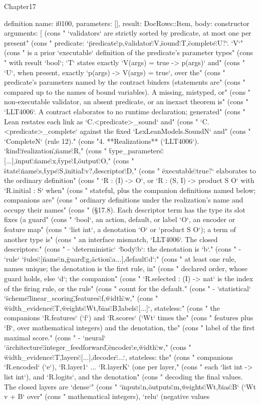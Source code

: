 \begin{lexlean}{Chapter17}
\begin{semanticmodule}
definition{
  name: i0100,
  parameters: [],
  result: DocRows::Item,
  body: constructor{
    arguments: [
      (cons "   `validators` are strictly sorted by predicate, at most one per present" (cons "   predicate: `{\"predicate\":p,\"validator\":V,\"sound\":T,\"complete\":U?}`. `V`" (cons "   is a prior `executable` definition of the predicate's parameter types" (cons "   with result `bool`; `T` states exactly `V(args) = true -> p(args)` and" (cons "   `U`, when present, exactly `p(args) -> V(args) = true`, over the" (cons "   predicate's parameters named by the contract binders (statements are" (cons "   compared up to the names of bound variables). A missing, mistyped, or" (cons "   non-executable validator, an absent predicate, or an inexact theorem is" (cons "   `LLT4006`. A contract elaborates to no runtime declaration; generated" (cons "   Lean restates each link as `C.<predicate>_sound` and" (cons "   `C.<predicate>_complete` against the fixed `LexLeanModels.SoundN` and" (cons "   `CompleteN` (rule 12)." (cons "4. **Realizations** (`LLT4006`). `{\"kind\":\"realization\",\"name\":R," (cons "   \"type_parameters\":[...],\"input\":{\"name\":x,\"type\":I},\"output\":O," (cons "   \"state\":{\"name\":s,\"type\":S,\"initial\":v}?,\"descriptor\":D," (cons "   \"executable\":true?}` elaborates to the ordinary definition" (cons "   `R : (I) -> O`, or `R : (S, I) -> product S O` with `R.initial : S` when" (cons "   stateful, plus the companion definitions named below; companions are" (cons "   ordinary definitions under the realization's name and occupy their names" (cons "   (§17.8). Each descriptor term has the type its slot fixes (a guard" (cons "   `bool`, an action, default, or label `O`, an encoder or feature map" (cons "   `list int`, a denotation `O` or `product S O`); a term of another type is" (cons "   an interface mismatch, `LLT4006`. The closed descriptors:" (cons "   - `deterministic` `{\"body\":b}`: the denotation is `b`." (cons "   - `rule` `{\"rules\":[{\"name\":n,\"guard\":g,\"action\":a}...],\"default\":d}`:" (cons "     at least one rule, names unique; the denotation is the first rule, in" (cons "     declared order, whose guard holds, else `d`; the companion" (cons "     `R.selected : (I) -> nat` is the index of the firing rule, or the rule" (cons "     count for the default." (cons "   - `statistical` `{\"scheme\":\"linear_scoring\",\"features\":f,\"width\":w," (cons "     \"width_evidence\":T,\"weights\":Wt,\"bias\":B,\"labels\":[...]}`, stateless:" (cons "     the companions `R.features` (`f`) and `R.scores` (`Wt` times the" (cons "     features plus `B`, over mathematical integers) and the denotation, the" (cons "     label of the first maximal score." (cons "   - `neural` `{\"architecture\":\"integer_feedforward\",\"encoder\":e,\"width\":w," (cons "     \"width_evidence\":T,\"layers\":[...],\"decoder\":...}`, stateless: the" (cons "     companions `R.encoded` (`e`), `R.layer1` ... `R.layerK` (one per layer," (cons "     each `list int -> list int`), and `R.logits`, and the denotation" (cons "     decoding the final values. The closed layers are `dense`" (cons "     `{\"inputs\":n,\"outputs\":m,\"weights\":Wt,\"bias\":B}` (`Wt v + B` over" (cons "     mathematical integers), `relu` (negative values }}
\end{semanticmodule}
\end{lexlean}
